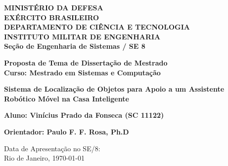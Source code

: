\begin{center}
\textbf{MINISTÉRIO DA DEFESA}\\
\textbf{EXÉRCITO BRASILEIRO}\\
\textbf{DEPARTAMENTO DE CIÊNCIA E TECNOLOGIA}\\
\textbf{INSTITUTO MILITAR DE ENGENHARIA}\\
\textbf{Seção de Engenharia de Sistemas / SE 8}

\vspace{2.5cm}

\begin{large}
\textbf{Proposta de Tema de Dissertação de Mestrado
\\Curso: Mestrado em Sistemas e Computação}

\vspace{1.5cm}

\textbf{Sistema de Localização de Objetos para Apoio a um Assistente Robótico Móvel na Casa Inteligente}

\vspace{1.5cm}

\textbf{Aluno: Vinícius Prado da Fonseca (SC 11122)}

\vspace{1.5cm}

\textbf{Orientador: Paulo F. F. Rosa, Ph.D}

\end{large}

\vspace{2cm}

\begin{small}
Data de Apresentação no SE/8:\\
Rio de Janeiro, \today
\end{small}

\end{center}
